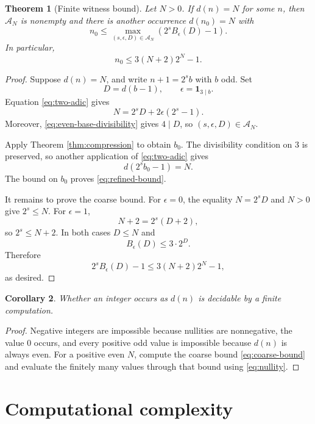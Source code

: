\documentclass[a4paper]{article}
\newtheorem{theorem}{Theorem}[section]
\newtheorem{corollary}[theorem]{Corollary}
\begin{document}
\begin{theorem}[Finite witness bound]\label{thm:finite-witness}
	Let $N>0$.
	If $d(n)=N$ for some $n$, then $\mathcal{A}_N$ is nonempty and
	there is another occurrence $d(n_0)=N$ with
	\begin{equation}\label{eq:refined-bound}
		n_0
		\leq
		\max_{(s,\epsilon,D)\in\mathcal{A}_N}
		\left(2^sB_\epsilon(D)-1\right).
	\end{equation}
	In particular,
	\begin{equation}\label{eq:coarse-bound}
		n_0\leq3(N+2)2^N-1.
	\end{equation}
\end{theorem}

\begin{proof}
	Suppose $d(n)=N$, and write $n+1=2^s b$ with $b$ odd.
	Set
	\[
		D=d(b-1),
		\qquad
		\epsilon=\mathbf{1}_{3\mid b}.
	\]
	Equation \eqref{eq:two-adic} gives
	\[
		N=2^sD+2\epsilon(2^s-1).
	\]
	Moreover, \eqref{eq:even-base-divisibility} gives $4\mid D$, so
	$(s,\epsilon,D)\in\mathcal{A}_N$.

	Apply Theorem \ref{thm:compression} to obtain $b_0$.
	The divisibility condition on 3 is preserved, so another application
	of \eqref{eq:two-adic} gives
	\[
		d(2^s b_0-1)=N.
	\]
	The bound on $b_0$ proves \eqref{eq:refined-bound}.

	It remains to prove the coarse bound.
	For $\epsilon=0$, the equality $N=2^sD$ and $N>0$ give
	$2^s\leq N$.
	For $\epsilon=1$,
	\[
		N+2=2^s(D+2),
	\]
	so $2^s\leq N+2$.
	In both cases $D\leq N$ and
	\[
		B_\epsilon(D)\leq3\cdot2^D.
	\]
	Therefore
	\[
		2^sB_\epsilon(D)-1
		\leq3(N+2)2^N-1,
	\]
	as desired.
\end{proof}

\begin{corollary}\label{cor:decidable}
	Whether an integer occurs as $d(n)$ is decidable by a finite
	computation.
\end{corollary}

\begin{proof}
	Negative integers are impossible because nullities are nonnegative,
	the value 0 occurs, and every positive odd value is impossible because
	$d(n)$ is always even.
	For a positive even $N$, compute the coarse bound
	\eqref{eq:coarse-bound} and evaluate the finitely many values through
	that bound using \eqref{eq:nullity}.
\end{proof}

\section{Computational complexity}
\end{document}
